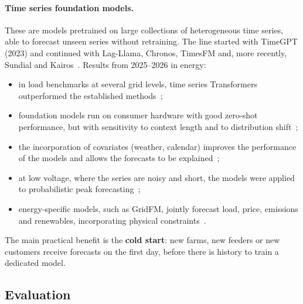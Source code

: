 \documentclass[10pt,a4paper,oneside]{article}
\begin{document}
\paragraph{Time series foundation models.} These are models pretrained on
large collections of heterogeneous time series, able to forecast unseen
series without retraining. The line started with TimeGPT (2023) and continued
with Lag-Llama, Chronos, TimesFM and, more recently, Sundial and
Kairos~\cite{fmreview}. Results from 2025--2026 in energy:
\begin{itemize}
  \item in load benchmarks at several grid levels, time series Transformers
    outperformed the established methods~\cite{loadbenchmark};
  \item foundation models run on consumer hardware with good zero-shot
    performance, but with sensitivity to context length and to distribution
    shift~\cite{tsfmconsumer};
  \item the incorporation of covariates (weather, calendar) improves the
    performance of the models and allows the forecasts to be
    explained~\cite{tsfmxai};
  \item at low voltage, where the series are noisy and short, the models
    were applied to probabilistic peak forecasting~\cite{lvpeak};
  \item energy-specific models, such as GridFM, jointly forecast load,
    price, emissions and renewables, incorporating physical
    constraints~\cite{gridfm}.
\end{itemize}
The main practical benefit is the \textbf{cold start}: new farms, new
feeders or new customers receive forecasts on the first day, before there is
history to train a dedicated model.

\subsection{Evaluation}
\end{document}
